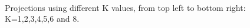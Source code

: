 \documentclass[a4paper,12pt]{article}
\begin{document}
\begin{figure}
~
~
\caption{Projections using different K values, from top left to bottom right: K=1,2,3,4,5,6 and 8.}
\label{fig:TeapotKs}
\end{figure}
\end{document}
